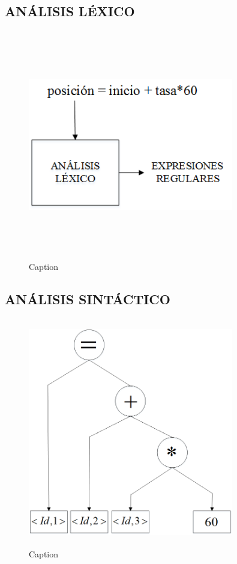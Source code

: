 \subsection{ANÁLISIS LÉXICO}



\begin{figure}[H]
    \centering
    \includegraphics[width=0.8\textwidth, height=10cm,keepaspectratio]{chapters/chapter1/figures/Fig3 Analisis Lexico.png}
    \caption{Caption}
    \label{fig:my_label}
\end{figure}
\subsection{ANÁLISIS SINTÁCTICO}
\begin{figure}[H]
    \centering
    \includegraphics[width=0.8\textwidth, height=10cm,keepaspectratio]{chapters/chapter1/figures/Fig4 Analisis Sintactico.png}
    \caption{Caption}
    \label{fig:my_label}
\end{figure}


